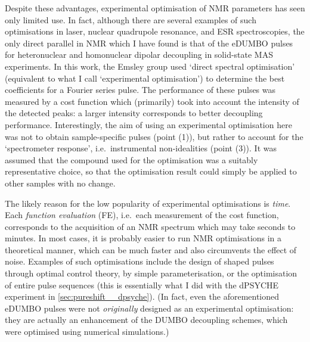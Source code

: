 Despite these advantages, experimental optimisation of NMR parameters has seen only limited use.
In fact, although there are several examples of such optimisations in laser\autocite{Bardeen1997CPL}, nuclear quadrupole resonance\autocite{Schiano1999JMR,Schiano2000ZNA,Monea2020JMR}, and ESR\autocite{Goodwin2018JMR} spectroscopies, 
the only direct parallel in NMR which I have found is that of the eDUMBO pulses for heteronuclear\autocite{DePaepe2003CPL,Elena2004CPL} and homonuclear dipolar\autocite{Salager2010CPL} decoupling in solid-state MAS experiments.
In this work, the Emsley group used `direct spectral optimisation' (equivalent to what I call `experimental optimisation') to determine the best coefficients for a Fourier series pulse.
The performance of these pulses was measured by a cost function which (primarily) took into account the intensity of the detected peaks: a larger intensity corresponds to better decoupling performance.
Interestingly, the aim of using an experimental optimisation here was not to obtain sample-specific pulses (point (1)), but rather to account for the `spectrometer response', i.e.\ instrumental non-idealities (point (3)).
It was assumed that the compound used for the optimisation was a suitably representative choice, so that the optimisation result could simply be applied to other samples with no change.

The likely reason for the low popularity of experimental optimisations is \textit{time}.
Each \textit{function evaluation} (FE), i.e.\ each measurement of the cost function, corresponds to the acquisition of an NMR spectrum which may take seconds to minutes.
In most cases, it is probably easier to run NMR optimisations in a theoretical manner, which can be much faster and also circumvents the effect of noise.
Examples of such optimisations include the design of shaped pulses through optimal control theory\autocite{Skinner2003JMR,Kobzar2004JMR,Khaneja2005JMR,Kobzar2008JMR,Kobzar2012JMR,Schilling2014ACIE,Glaser2015EPJD}, by simple parameterisation\autocite{Geen1989JMR,Emsley1990CPL,Geen1991JMR,Nuzillard1994JMRSA,Kupce1995JMRSA,Kupce1995JMRSB}, or the optimisation of entire pulse sequences\autocite{Shaka1985JMR,Freeman1987JMR,Bechmann2013JMR,Ehni2014JMR,Lapin2020JMR} (this is essentially what I did with the dPSYCHE experiment in \cref{sec:pureshift__dpsyche}).
(In fact, even the aforementioned eDUMBO pulses were not \textit{originally} designed as an experimental optimisation: they are actually an enhancement of the DUMBO decoupling schemes, which were optimised using numerical simulations\autocite{Sakellariou2000CPL}.)

